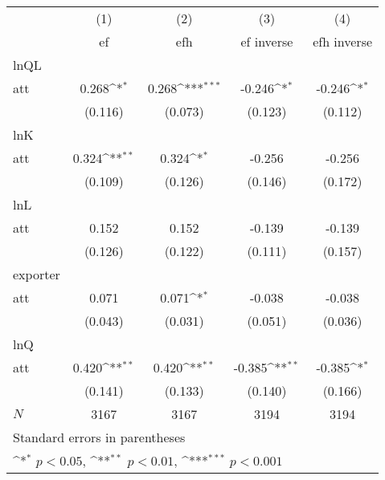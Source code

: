 {
\def\sym#1{\ifmmode^{#1}\else\(^{#1}\)\fi}
\begin{tabular}{l*{4}{c}}
\hline\hline
            &\multicolumn{1}{c}{(1)}&\multicolumn{1}{c}{(2)}&\multicolumn{1}{c}{(3)}&\multicolumn{1}{c}{(4)}\\
            &\multicolumn{1}{c}{ef}&\multicolumn{1}{c}{efh}&\multicolumn{1}{c}{ef inverse}&\multicolumn{1}{c}{efh inverse}\\
\hline
lnQL        &                     &                     &                     &                     \\
att         &       0.268\sym{*}  &       0.268\sym{***}&      -0.246\sym{*}  &      -0.246\sym{*}  \\
            &     (0.116)         &     (0.073)         &     (0.123)         &     (0.112)         \\
\hline
lnK         &                     &                     &                     &                     \\
att         &       0.324\sym{**} &       0.324\sym{*}  &      -0.256         &      -0.256         \\
            &     (0.109)         &     (0.126)         &     (0.146)         &     (0.172)         \\
\hline
lnL         &                     &                     &                     &                     \\
att         &       0.152         &       0.152         &      -0.139         &      -0.139         \\
            &     (0.126)         &     (0.122)         &     (0.111)         &     (0.157)         \\
\hline
exporter    &                     &                     &                     &                     \\
att         &       0.071         &       0.071\sym{*}  &      -0.038         &      -0.038         \\
            &     (0.043)         &     (0.031)         &     (0.051)         &     (0.036)         \\
\hline
lnQ         &                     &                     &                     &                     \\
att         &       0.420\sym{**} &       0.420\sym{**} &      -0.385\sym{**} &      -0.385\sym{*}  \\
            &     (0.141)         &     (0.133)         &     (0.140)         &     (0.166)         \\
\hline
\(N\)       &        3167         &        3167         &        3194         &        3194         \\
\hline\hline
\multicolumn{5}{l}{\footnotesize Standard errors in parentheses}\\
\multicolumn{5}{l}{\footnotesize \sym{*} \(p<0.05\), \sym{**} \(p<0.01\), \sym{***} \(p<0.001\)}\\
\end{tabular}
}
